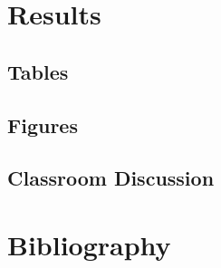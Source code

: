 \section{Results}

\subsection{Tables}

\subsection{Figures}

\subsection{Classroom Discussion}

\section{Bibliography}
